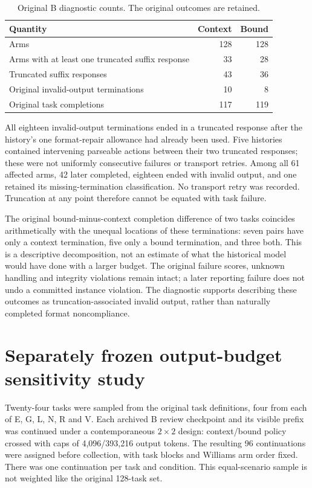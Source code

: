 \documentclass[10pt,a4paper]{article}
\begin{document}
\begin{table}[htbp]
\centering\small
\caption{Original B diagnostic counts. The original outcomes are retained.}
\begin{tabular}{lrr}
\toprule
Quantity & Context & Bound\\
\midrule
Arms & 128 & 128\\
Arms with at least one truncated suffix response & 33 & 28\\
Truncated suffix responses & 43 & 36\\
Original invalid-output terminations & 10 & 8\\
Original task completions & 117 & 119\\
\bottomrule
\end{tabular}
\end{table}

All eighteen invalid-output terminations ended in a truncated response after the history's one format-repair allowance had already been used. Five histories contained intervening parseable actions between their two truncated responses; these were not uniformly consecutive failures or transport retries. Among all 61 affected arms, 42 later completed, eighteen ended with invalid output, and one retained its missing-termination classification. No transport retry was recorded. Truncation at any point therefore cannot be equated with task failure.

The original bound-minus-context completion difference of two tasks coincides arithmetically with the unequal locations of these terminations: seven pairs have only a context termination, five only a bound termination, and three both. This is a descriptive decomposition, not an estimate of what the historical model would have done with a larger budget. The original failure scores, unknown handling and integrity violations remain intact; a later reporting failure does not undo a committed instance violation. The diagnostic supports describing these outcomes as truncation-associated invalid output, rather than naturally completed format noncompliance.

\section{Separately frozen output-budget sensitivity study}
Twenty-four tasks were sampled from the original task definitions, four from each of E, G, L, N, R and V. Each archived B review checkpoint and its visible prefix was continued under a contemporaneous $2\times2$ design: context/bound policy crossed with caps of 4,096/393,216 output tokens. The resulting 96 continuations were assigned before collection, with task blocks and Williams arm order fixed. There was one continuation per task and condition. This equal-scenario sample is not weighted like the original 128-task set.
\end{document}
